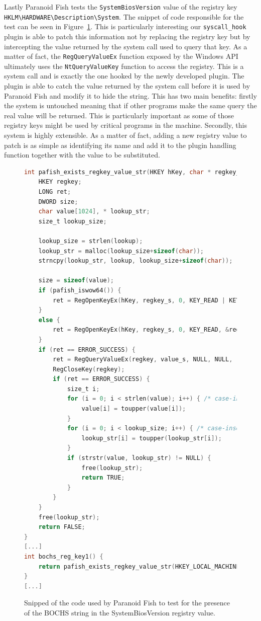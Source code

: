Lastly Paranoid Fish tests the \lstinline{SystemBiosVersion} value of the registry key \lstinline{HKLM\HARDWARE\Description\System}. The snippet of code responsible for the test can be seen in Figure~\ref{fig:patest2}. This is particularly interesting our \lstinline{syscall_hook} plugin is able to patch this information not by replacing the registry key but by intercepting the value returned by the system call used to query that key. As a matter of fact, the \lstinline{RegQueryValueEx} function exposed by the Windows API ultimately uses the \lstinline{NtQueryValueKey} function to access the registry. This is a system call and is exactly the one hooked by the newly developed plugin. The plugin is able to catch the value returned by the system call before it is used by Paranoid Fish and modify it to hide the string. This has two main benefits: firstly the system is untouched meaning that if other programs make the same query the real value will be returned. This is particularly important as some of those registry keys might be used by critical programs in the machine. Secondly, this system is highly extensible. As a matter of fact, adding a new registry value to patch is as simple as identifying its name and add it to the plugin handling function together with the value to be substituted.

\begin{figure}[h!]
\centering
\begin{lstlisting}[language=C]
int pafish_exists_regkey_value_str(HKEY hKey, char * regkey_s, char * value_s, char * lookup) {
	HKEY regkey;
	LONG ret;
	DWORD size;
	char value[1024], * lookup_str;
	size_t lookup_size;

	lookup_size = strlen(lookup);
	lookup_str = malloc(lookup_size+sizeof(char));
	strncpy(lookup_str, lookup, lookup_size+sizeof(char));

	size = sizeof(value);
	if (pafish_iswow64()) {
		ret = RegOpenKeyEx(hKey, regkey_s, 0, KEY_READ | KEY_WOW64_64KEY, &regkey);
	}
	else {
		ret = RegOpenKeyEx(hKey, regkey_s, 0, KEY_READ, &regkey);
	}
	if (ret == ERROR_SUCCESS) {
		ret = RegQueryValueEx(regkey, value_s, NULL, NULL, (BYTE*)value, &size);
		RegCloseKey(regkey);
		if (ret == ERROR_SUCCESS) {
			size_t i;
			for (i = 0; i < strlen(value); i++) { /* case-insensitive */
				value[i] = toupper(value[i]);
			}
			for (i = 0; i < lookup_size; i++) { /* case-insensitive */
				lookup_str[i] = toupper(lookup_str[i]);
			}
			if (strstr(value, lookup_str) != NULL) {
				free(lookup_str);
				return TRUE;
			}
		}
	}
	free(lookup_str);
	return FALSE;
}
[...]
int bochs_reg_key1() {
	return pafish_exists_regkey_value_str(HKEY_LOCAL_MACHINE, "HARDWARE\\Description\\System", "SystemBiosVersion", "BOCHS");
}
[...]
\end{lstlisting}
\caption{Snipped of the code used by Paranoid Fish to test for the presence of the BOCHS string in the SystemBiosVersion registry value.}
\label{fig:patest2}
\end{figure}

